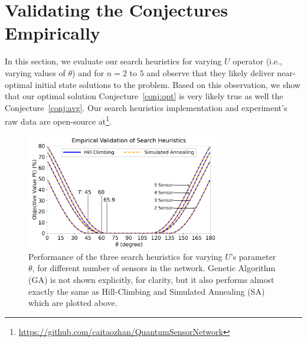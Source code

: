 \section{Validating the Conjectures Empirically}
\label{sec:sim}

In this section, we evaluate our search heuristics for varying $U$ operator (i.e., varying values of $\theta$) and for $n = 2$ to $5$ and observe that they likely deliver
near-optimal initial state solutions to the \iso problem. 
Based on this observation, we show that our optimal solution Conjecture~\ref{conj:opt} is very
likely true as well the Conjecture~\ref{conj:avg}.
Our search heuristics implementation and 
experiment's raw data are open-source at\footnote{\url{https://github.com/caitaozhan/QuantumSensorNetwork}}.



\begin{figure}
    \centering
    \includegraphics[width=0.75\textwidth]{chapters/tqc/figures/varying_theta_nsensors.png}
    \caption{Performance of the three search heuristics for varying $U$'s parameter $\theta$, for different number of sensors in the network. Genetic Algorithm (GA) is not shown explicitly, for clarity, but it also performs almost exactly the same as Hill-Climbing and Simulated Annealing (SA) which are plotted above.}
    \label{fig:heuristics}
\end{figure}


